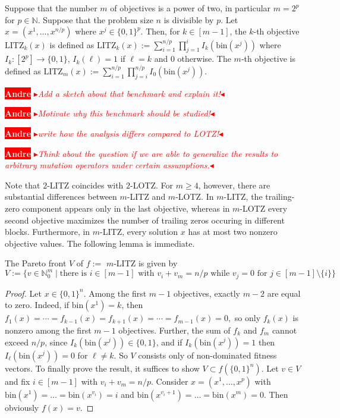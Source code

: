 \documentclass[
sigconf = false, %
review = false, %
screen = true, %
anonymous = true, %
format=acmsmall
]{acmart}
\newcommand{\nbc}[3]{
		{\colorbox{#3}{\bfseries\sffamily\scriptsize\textcolor{white}{#1}}}
		{\textcolor{#3}{\sf\small$\blacktriangleright$\textit{#2}$\blacktriangleleft$}}
}
\newcommand{\andre}[1]{\nbc{Andre}{#1}{red}}
\begin{document}
\begin{definition}
\label{def:LeadingIntegersTrailingZeros}
Suppose that the number $m$ of objectives is a power of two, in particular $m = 2^p$ for $p \in \mathbb{N}$. Suppose that the problem size $n$ is divisible by $p$. Let $x=(x^1, \ldots , x^{n/p})$ where $x^j \in \{0,1\}^p$. Then, for $k \in [m-1]$, the $k$-th objective $\text{LITZ}_k(x)$ is defined as $\text{LITZ}_k(x) := \sum_{i=1}^{n/p} \prod_{j=1}^i I_k(\text{bin}(x^j))$ where $I_k:[2^p] \to \{0,1\}$, $I_k(\ell) = 1$ if $\ell=k$ and $0$ otherwise. The $m$-th objective is defined as $\text{LITZ}_m(x) := \sum_{i=1}^{n/p} \prod_{j=i}^{n/p} I_0(\text{bin}(x^j))$.
\end{definition}

\andre{Add a sketch about that benchmark and explain it!}

\andre{Motivate why this benchmark should be studied!}

\andre{write how the analysis differs compared to LOTZ!} 

\andre{Think about the question if we are able to generalize the results to arbitrary mutation operators under certain assumptions.} 


Note that $2$-LITZ coincides with $2$-LOTZ. For $m \geq 4$, however, there are substantial differences between $m$-LITZ and $m$-LOTZ. In $m$-LITZ, the trailing-zero component appears only in the last objective, whereas in $m$-LOTZ every second objective maximizes the number of trailing zeros occuring in different blocks. Furthermore, in $m$-LITZ, every solution $x$ has at most two nonzero objective values. The following lemma is immediate.

\begin{lemma}

The Pareto front $V$ of $f:=$ $m$-LITZ is given by 
$$V:=\{v \in \mathbb{N}_0^m \mid \text{there is } i \in [m-1] \text{ with } v_i + v_m = n/p \text{ while } v_j = 0 \text{ for } j \in [m-1] \setminus \{i\}\}$$
\end{lemma}

\begin{proof}
Let $x \in \{0,1\}^n$. Among the first $m-1$ objectives, exactly $m-2$ are equal to zero. Indeed, if $\text{bin}(x^1)=k$, then $
f_1(x)=\cdots=f_{k-1}(x)=f_{k+1}(x)=\cdots=f_{m-1}(x)=0,
$
so only $f_k(x)$ is nonzero among the first $m-1$ objectives. Further, the sum of $f_k$ and $f_m$ cannot exceed $n/p$, since $I_k(\text{bin}(x^j)) \in \{0,1\}$, and if $I_k(\text{bin}(x^j)) =1$ then $I_\ell(\text{bin}(x^j))=0$ for $\ell \neq k$. So $V$ consists only of non-dominated fitness vectors. To finally prove the result, it suffices to show $V \subset f(\{0,1\}^n)$. Let $v \in V$ and fix $i \in [m-1]$ with $v_i+v_m=n/p$. Consider $x=(x^1, \ldots ,x^p)$ with $\text{bin}(x^1) = \ldots = \text{bin}(x^{v_i}) = i$ and $\text{bin}(x^{v_i+1}) = \ldots = \text{bin}(x^m) = 0$. Then obviously $f(x)=v$. 
\end{proof}
\end{document}
